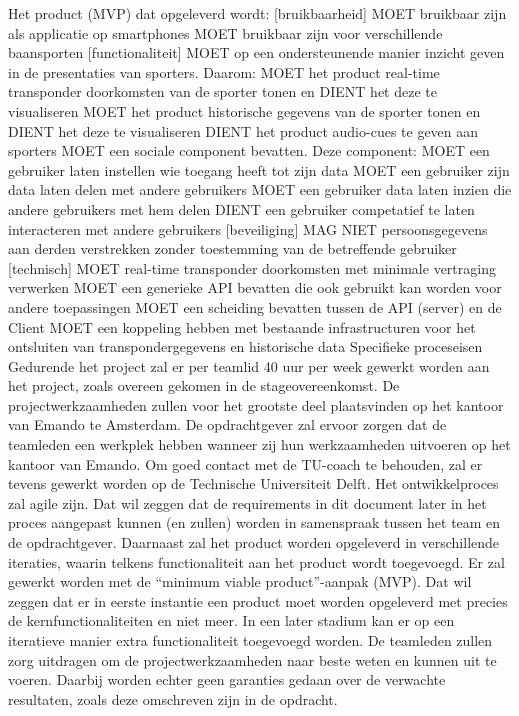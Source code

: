 Het product (MVP) dat opgeleverd wordt:
[bruikbaarheid]
MOET bruikbaar zijn als applicatie op smartphones
MOET bruikbaar zijn voor verschillende baansporten
[functionaliteit]
MOET op een ondersteunende manier inzicht geven in de presentaties van sporters. Daarom:
MOET het product real-time transponder doorkomsten van de sporter tonen en DIENT het deze te visualiseren
MOET het product historische gegevens van de sporter tonen en DIENT het deze te visualiseren
DIENT het product audio-cues te geven aan sporters
MOET een sociale component bevatten. Deze component:
MOET een gebruiker laten instellen wie toegang heeft tot zijn data
MOET een gebruiker zijn data laten delen met andere gebruikers
MOET een gebruiker data laten inzien die andere gebruikers met hem delen
DIENT een gebruiker competatief te laten interacteren met andere gebruikers
[beveiliging]
MAG NIET persoonsgegevens aan derden verstrekken zonder toestemming van de betreffende gebruiker
[technisch]
MOET real-time transponder doorkomsten met minimale vertraging verwerken
MOET een generieke API bevatten die ook gebruikt kan worden voor andere toepassingen
MOET een scheiding bevatten tussen de API (server) en de Client
MOET een koppeling hebben met bestaande infrastructuren voor het ontsluiten van transpondergegevens en historische data
Specifieke proceseisen
Gedurende het project zal er per teamlid 40 uur per week gewerkt worden aan het project, zoals overeen gekomen in de stageovereenkomst.
De projectwerkzaamheden zullen voor het grootste deel plaatsvinden op het kantoor van Emando te Amsterdam. 
De opdrachtgever zal ervoor zorgen dat de teamleden een werkplek hebben wanneer zij hun werkzaamheden uitvoeren op het kantoor van Emando.
Om goed contact met de TU-coach te behouden, zal er tevens gewerkt worden op de Technische Universiteit Delft.
Het ontwikkelproces zal agile zijn. Dat wil zeggen dat de requirements in dit document later in het proces aangepast kunnen (en zullen) worden in samenspraak tussen het team en de opdrachtgever. Daarnaast zal het product worden opgeleverd in verschillende iteraties, waarin telkens functionaliteit aan het product wordt toegevoegd.
Er zal gewerkt worden met de “minimum viable product”-aanpak (MVP). Dat wil zeggen dat er in eerste instantie een product moet worden opgeleverd met precies de kernfunctionaliteiten en niet meer. In een later stadium kan er op een iteratieve manier extra functionaliteit toegevoegd worden.
De teamleden zullen zorg uitdragen om de projectwerkzaamheden naar beste weten en kunnen uit te voeren. Daarbij worden echter geen garanties gedaan over de verwachte resultaten, zoals deze omschreven zijn in de opdracht.


